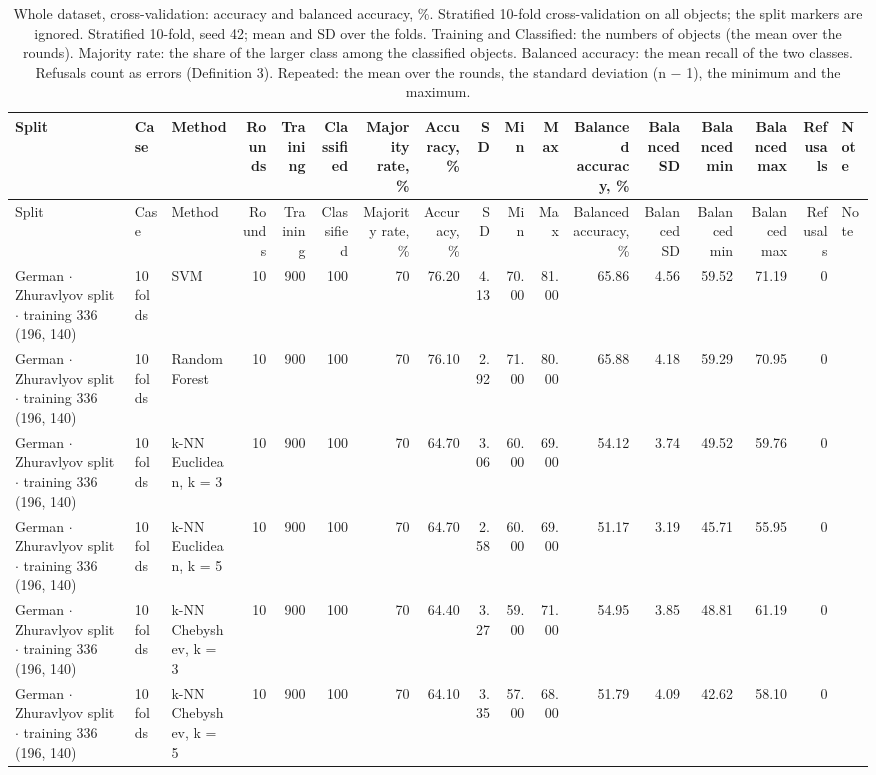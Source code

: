 \begin{longtable}{lllrrrrrrrrrrrrrl}
  \caption{Whole dataset, cross-validation: accuracy and balanced accuracy, \%. Stratified 10-fold cross-validation on all objects; the split markers are ignored. Stratified 10-fold, seed 42; mean and SD over the folds. Training and Classified: the numbers of objects (the mean over the rounds). Majority rate: the share of the larger class among the classified objects. Balanced accuracy: the mean recall of the two classes. Refusals count as errors (Definition 3). Repeated: the mean over the rounds, the standard deviation (n $-$ 1), the minimum and the maximum.}\label{tab:cross-validation} \\
  \toprule
  Split & Case & Method & Rounds & Training & Classified & Majority rate, \% & Accuracy, \% & SD & Min & Max & Balanced accuracy, \% & Balanced SD & Balanced min & Balanced max & Refusals & Note \\
  \midrule
  \endfirsthead
  \toprule
  Split & Case & Method & Rounds & Training & Classified & Majority rate, \% & Accuracy, \% & SD & Min & Max & Balanced accuracy, \% & Balanced SD & Balanced min & Balanced max & Refusals & Note \\
  \midrule
  \endhead
  \bottomrule
  \endfoot
  German $\cdot$ Zhuravlyov split $\cdot$ training 336 (196, 140) & 10 folds & SVM & 10 & 900 & 100 & 70 & 76.20 & 4.13 & 70.00 & 81.00 & 65.86 & 4.56 & 59.52 & 71.19 & 0 &  \\
  German $\cdot$ Zhuravlyov split $\cdot$ training 336 (196, 140) & 10 folds & Random Forest & 10 & 900 & 100 & 70 & 76.10 & 2.92 & 71.00 & 80.00 & 65.88 & 4.18 & 59.29 & 70.95 & 0 &  \\
  German $\cdot$ Zhuravlyov split $\cdot$ training 336 (196, 140) & 10 folds & k-NN Euclidean, k = 3 & 10 & 900 & 100 & 70 & 64.70 & 3.06 & 60.00 & 69.00 & 54.12 & 3.74 & 49.52 & 59.76 & 0 &  \\
  German $\cdot$ Zhuravlyov split $\cdot$ training 336 (196, 140) & 10 folds & k-NN Euclidean, k = 5 & 10 & 900 & 100 & 70 & 64.70 & 2.58 & 60.00 & 69.00 & 51.17 & 3.19 & 45.71 & 55.95 & 0 &  \\
  German $\cdot$ Zhuravlyov split $\cdot$ training 336 (196, 140) & 10 folds & k-NN Chebyshev, k = 3 & 10 & 900 & 100 & 70 & 64.40 & 3.27 & 59.00 & 71.00 & 54.95 & 3.85 & 48.81 & 61.19 & 0 &  \\
  German $\cdot$ Zhuravlyov split $\cdot$ training 336 (196, 140) & 10 folds & k-NN Chebyshev, k = 5 & 10 & 900 & 100 & 70 & 64.10 & 3.35 & 57.00 & 68.00 & 51.79 & 4.09 & 42.62 & 58.10 & 0 &  \\

\end{longtable}
